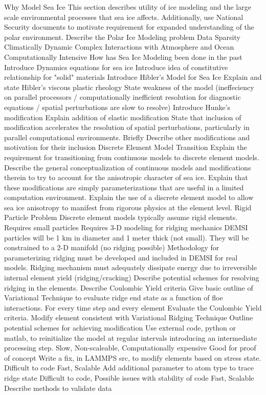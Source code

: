 \begin{outline}[enumerate]
\1 Why Model Sea Ice
\2 This section describes utility of ice modeling and the large scale environmental processes that sea ice affects.  Additionally, use National Security documents to motivate requirement for expanded understanding of the polar environment.
\2 Describe the Polar Ice Modeling problem
\3 Data Sparsity
\3 Climatically Dynamic
\3 Complex Interactions with Atmosphere and Ocean
\3 Computationally Intensive
\1 How has Sea Ice Modeling been done in the past
\2 Introduce Dynamics equations for sea ice
\3 Introduce idea of constitutive relationship for "solid" materials
\2 Introduce Hibler's Model for Sea Ice
\3 Explain and state Hibler's viscous plastic rheology
\3 State weakness of the model (ineffeciency on parallel processors / computationally inefficient resolution for diagnostic equations / spatial perturbations are slow to resolve)
\2 Introduce Hunke's modification
\3 Explain addition of elastic modification
\3 State that inclusion of modification accelerates the resolution of spatial perturbations, particularly in parallel computational environments.
\2 Briefly Describe other modifications and motivation for their inclusion
\1 Discrete Element Model Transition
\2 Explain the requirement for transitioning from continuous models to discrete element models.
\3 Describe the general conceptualization of continuous models and modifications therein to try to account for the anisotropic character of sea ice.
\3 Explain that these modifications are simply parameterizations that are useful in a limited computation environment.
\2 Explain the use of a discrete element model to allow sea ice anisotropy to manifest from rigorous physics at the element level.
\1 Rigid Particle Problem
\2 Discrete element models typically assume rigid elements.
\3 Requires small particles
\3 Requires 3-D modeling for ridging mechanics
\2 DEMSI particles will be 1 km in diameter and 1 meter thick (not small).  They will be constrained to a 2-D manifold (no ridging possible)
\2 Methodology for parameterizing ridging must be developed and included in DEMSI for real models.
\3 Ridging mechanism must adequately dissipate energy due to irreversible internal element yield (ridging/cracking)
\1 Describe potential schemes for resolving ridging in the elements.
\2 Describe Coulombic Yield criteria
\2 Give basic outline of Variational Technique to evaluate ridge end state as a function of floe interactions.
\2 For every time step and every element
\3 Evaluate the Coulombic Yield criteria.
\3 Modify element consistent with Variational Ridging Technique
\2 Outline potential schemes for achieving modification
\3 Use external code, python or matlab, to reinitialize the model at regular intervals introducing an intermediate processing step.
\4 Slow, Non-scaleable, Computationally expensive
\4 Good for proof of concept
\3 Write a fix, in LAMMPS src, to modify elements based on stress state.
\4 Difficult to code
\4 Fast, Scalable
\3 Add additional parameter to atom type to trace ridge state
\4 Difficult to code, Possible issues with stability of code
\4 Fast, Scalable
\2 Describe methods to validate data
\end{outline}